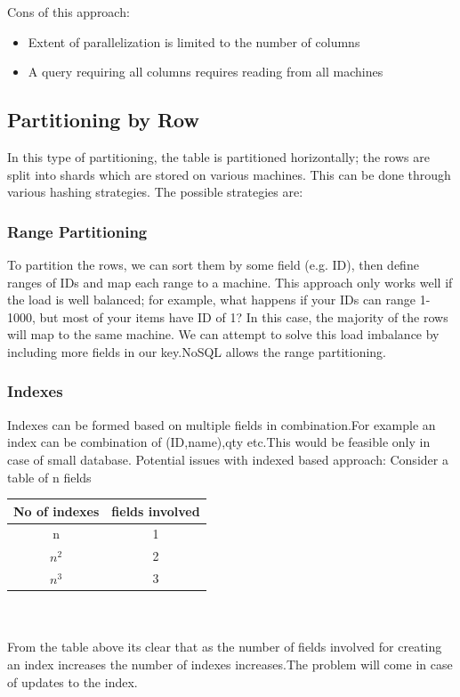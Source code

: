 \documentclass[twoside]{article}
\begin{document}
Cons of this approach:
\begin{itemize}
\item Extent of parallelization is limited to the number of columns
\item A query requiring all columns requires reading from all machines
\end{itemize}

\subsection{Partitioning by Row}
In this type of partitioning, the table is partitioned horizontally; the rows are split into shards which are stored on various machines. This can be done through various hashing strategies.
The possible strategies are:

\subsubsection{Range Partitioning}
To partition the rows, we can sort them by some field (e.g. ID), then define ranges of IDs and map each range to a machine. This approach only works well if the load is well balanced; for example, what happens if your IDs can range 1-1000, but most of your items have ID of 1? In this case, the majority of the rows will map to the same machine. We can attempt to solve this load imbalance by including more fields in our key.NoSQL allows the range partitioning.

\subsubsection{Indexes}
Indexes can be formed based on multiple fields in combination.For example an index can be combination of {(ID,name),qty} etc.This would be feasible only in case of small database.
Potential issues with indexed based approach:
Consider a table of n fields\\
\begin{tabular}{c|c}
No of indexes & fields involved \\
\hline
n & 1  \\  
 \hline
\[ n^2\] & 2 \\
 \hline
\[ n^3\] & 3\\
 \hline
\end{tabular} \\\\
From the table above its clear that as the number of fields involved for creating an index increases the number of indexes increases.The problem will come in case of updates to the index.
\end{document}
